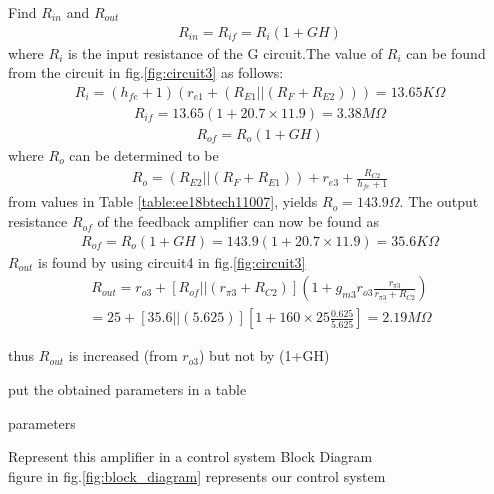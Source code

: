 \begin{enumerate}[label=\thesubsection.\arabic*.,ref=\thesubsection.\theenumi]
{\item Find $R_{in}$ and $R_{out}$
\\
\solution
\begin{align}
    R_{in} =R_{if}=R_i(1+GH)
\end{align}
where $R_i$ is the input resistance of the G circuit.The value of $R_i$ can be found from the circuit in fig.\ref{fig:circuit3} as follows:
\begin{align}
    R_i=(h_{fe}+1)(r_{e1}+(R_{E1}||(R_F+R_{E2})))=13.65K\Omega
\end{align} 
\begin{align}
    R_{if}=13.65(1+20.7\times11.9)=3.38M\Omega
\end{align}
\begin{align}
    R_{of}=R_o(1+GH)
\end{align}
where $R_o$ can be determined to be 
 \begin{align}
    R_o=(R_{E2}||(R_F+R_{E1}))+r_{e3}+\frac{R_{C2}}{h_{fe}+1}
\end{align}
from values in Table \ref{table:ee18btech11007}, yields $R_o = 143.9 \Omega$. The output resistance $R_{of}$ of the feedback amplifier can now be found as
\begin{align}
    R_{of}=R_o(1+GH)=143.9(1+20.7\times11.9)=35.6K\Omega
\end{align}
$R_{out}$ is found by using circuit4 in fig.\ref{fig:circuit3}
\begin{align}
    R_{out}=r_{o3}+[R_{of}||(r_{\pi3}+R_{C2})](1+g_{m3}r_{o3}\frac{r_{\pi3}}{r_{\pi3}+R_{C2}})
\end{align}
\begin{align}
=25+[35.6||(5.625)][1+160\times25\frac{0.625}{5.625}]=2.19M\Omega \end{align}

thus $R_{out}$ is increased (from $r_{o3}$) but not by (1+GH)
\item put the obtained parameters in a table
\\
\solution 
\begin{table}[!ht]
\centering

\caption{parameters}
\label{table:parameters}
\end{table}
\item Represent this amplifier in  a control system Block Diagram
\\
\solution figure in  fig.\ref{fig:block_diagram} represents our control system
\begin{figure}[!ht]
	\begin{center}
		

\end{center}
\end{figure}}
\end{enumerate}
